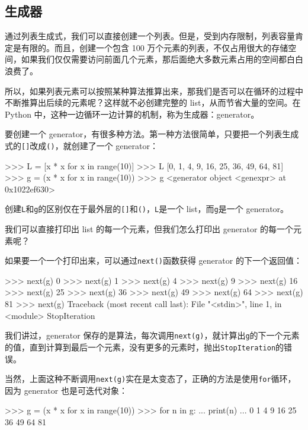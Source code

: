 \hypertarget{ux751fux6210ux5668}{%
\subsection{生成器}\label{ux751fux6210ux5668}}

通过列表生成式，我们可以直接创建一个列表。但是，受到内存限制，列表容量肯定是有限的。而且，创建一个包含
100
万个元素的列表，不仅占用很大的存储空间，如果我们仅仅需要访问前面几个元素，那后面绝大多数元素占用的空间都白白浪费了。

所以，如果列表元素可以按照某种算法推算出来，那我们是否可以在循环的过程中不断推算出后续的元素呢？这样就不必创建完整的
list，从而节省大量的空间。在 Python
中，这种一边循环一边计算的机制，称为生成器：generator。

要创建一个
generator，有很多种方法。第一种方法很简单，只要把一个列表生成式的\texttt{{[}{]}}改成\texttt{()}，就创建了一个
generator：

\begin{pythoncode}
>>> L = [x * x for x in range(10)]
>>> L
[0, 1, 4, 9, 16, 25, 36, 49, 64, 81]
>>> g = (x * x for x in range(10))
>>> g
<generator object <genexpr> at 0x1022ef630>
\end{pythoncode}

创建\texttt{L}和\texttt{g}的区别仅在于最外层的\texttt{{[}{]}}和\texttt{()}，\texttt{L}是一个
list，而\texttt{g}是一个 generator。

我们可以直接打印出 list 的每一个元素，但我们怎么打印出 generator
的每一个元素呢？

如果要一个一个打印出来，可以通过\texttt{next()}函数获得 generator
的下一个返回值：

\begin{pythoncode}
>>> next(g)
0
>>> next(g)
1
>>> next(g)
4
>>> next(g)
9
>>> next(g)
16
>>> next(g)
25
>>> next(g)
36
>>> next(g)
49
>>> next(g)
64
>>> next(g)
81
>>> next(g)
Traceback (most recent call last):
  File "<stdin>", line 1, in <module>
StopIteration
\end{pythoncode}

我们讲过，generator
保存的是算法，每次调用\texttt{next(g)}，就计算出\texttt{g}的下一个元素的值，直到计算到最后一个元素，没有更多的元素时，抛出\texttt{StopIteration}的错误。

当然，上面这种不断调用\texttt{next(g)}实在是太变态了，正确的方法是使用\texttt{for}循环，因为
generator 也是可迭代对象：

\begin{pythoncode}
>>> g = (x * x for x in range(10))
>>> for n in g:
...     print(n)
... 
0
1
4
9
16
25
36
49
64
81
\end{pythoncode}

